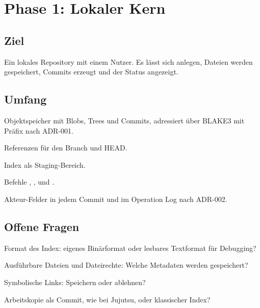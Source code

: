 \chapter{Phase 1: Lokaler Kern}

\section{Ziel}

Ein lokales Repository mit einem Nutzer. Es lässt sich anlegen, Dateien werden gespeichert, Commits erzeugt und der Status angezeigt.

\section{Umfang}

\startitemize
\item Objektspeicher mit Blobs, Trees und Commits, adressiert über BLAKE3 mit Präfix nach ADR-001.
\item Referenzen für den Branch  und HEAD.
\item Index als Staging-Bereich.
\item Befehle , ,  und .
\item Akteur-Felder in jedem Commit und im Operation Log nach ADR-002.
\stopitemize

\section{Offene Fragen}

\startitemize
\item Format des Index: eigenes Binärformat oder lesbares Textformat für Debugging?
\item Ausführbare Dateien und Dateirechte: Welche Metadaten werden gespeichert?
\item Symbolische Links: Speichern oder ablehnen?
\item Arbeitskopie als Commit, wie bei Jujutsu, oder klassischer Index?
\stopitemize
